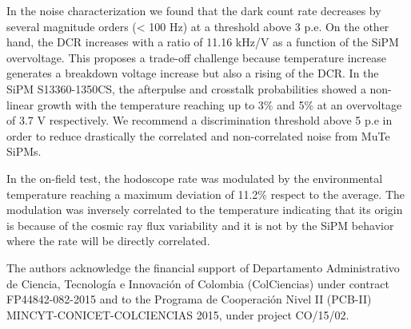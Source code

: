 \documentclass[a4paper,11pt]{article}
\begin{document}
In the noise characterization we found that the dark count rate decreases by several magnitude orders (< 100 Hz) at a threshold above 3 p.e. On the other hand, the DCR increases with a ratio of 11.16 kHz/V as a function of the SiPM overvoltage. This proposes a trade-off challenge because temperature increase generates a breakdown voltage increase but also a rising of the DCR. In the SiPM S13360-1350CS, the afterpulse and crosstalk probabilities showed a non-linear growth with the temperature reaching up to 3$\%$ and 5$\%$ at an overvoltage of 3.7 V respectively. We recommend a discrimination threshold above 5 p.e in order to reduce drastically the correlated and non-correlated noise from MuTe SiPMs. 

In the on-field test, the hodoscope rate was modulated by the environmental temperature reaching a maximum deviation of 11.2$\%$ respect to the average. The modulation was inversely correlated to the temperature indicating that its origin is because of the cosmic ray flux variability and it is not by the SiPM behavior where the rate will be directly correlated.




\acknowledgments

The authors acknowledge the financial support of  Departamento Administrativo de Ciencia, Tecnolog\'ia e Innovaci\'on of Colombia (ColCiencias) under contract FP44842-082-2015 and to the Programa de Cooperaci\'on Nivel II (PCB-II) MINCYT-CONICET-COLCIENCIAS 2015, under project CO/15/02.








\end{document}
